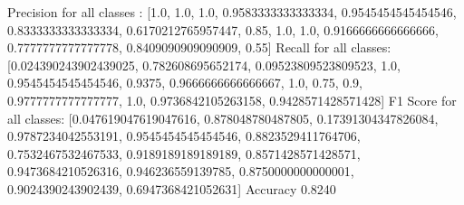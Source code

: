 Precision for all classes : [1.0, 1.0, 1.0, 0.9583333333333334, 0.9545454545454546, 0.8333333333333334, 0.6170212765957447, 0.85, 1.0, 1.0, 0.9166666666666666, 0.7777777777777778, 0.8409090909090909, 0.55]
Recall for all classes: [0.024390243902439025, 0.782608695652174, 0.09523809523809523, 1.0, 0.9545454545454546, 0.9375, 0.9666666666666667, 1.0, 0.75, 0.9, 0.9777777777777777, 1.0, 0.9736842105263158, 0.9428571428571428]
F1 Score for all classes: [0.047619047619047616, 0.878048780487805, 0.17391304347826084, 0.9787234042553191, 0.9545454545454546, 0.8823529411764706, 0.7532467532467533, 0.9189189189189189, 0.8571428571428571, 0.9473684210526316, 0.946236559139785, 0.8750000000000001, 0.9024390243902439, 0.6947368421052631]
Accuracy 0.8240

